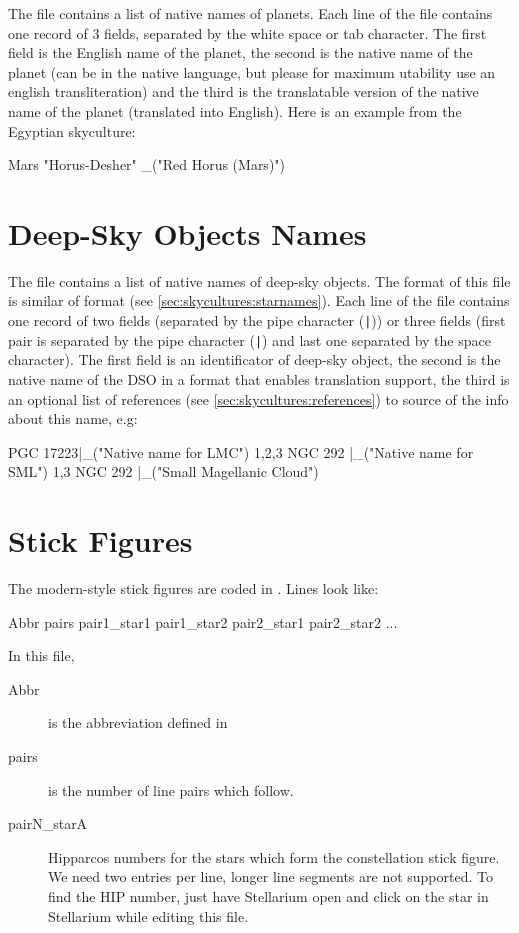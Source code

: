 The file  contains a list of native names of
planets. Each line of the file contains one record of 3 fields,
separated by the white space or tab character. The first field is the
English name of the planet, the second is the native name of the
planet (can be in the native language, but please for maximum
utability use an english transliteration) and the third is the
translatable version of the native name of the planet (translated into
English). Here is an example from the Egyptian skyculture:

\begin{configfile}
Mars	"Horus-Desher"	_("Red Horus (Mars)")
\end{configfile}

\section{Deep-Sky Objects Names}
\label{sec:skycultures:dsonames}

 The file  contains a list of native names of
deep-sky objects. The format of this file is similar of 
 format (see \ref{sec:skycultures:starnames}).
Each line of the file contains one record of two fields (separated 
by the pipe character (\texttt{|})) or three fields (first pair is 
separated by the pipe character (\texttt{|}) and last one separated 
by the space character). The first field is an identificator of 
deep-sky object, the second is the native name of the DSO in a 
format that enables translation support, the third is an optional 
list of references (see \ref{sec:skycultures:references}) to source 
of the info about this name, e.g:
\begin{configfile}
PGC 17223|_("Native name for LMC") 1,2,3
NGC 292  |_("Native name for SML") 1,3
NGC 292  |_("Small Magellanic Cloud")
\end{configfile}

\section{Stick Figures}
\label{sec:skycultures:stickfigures}



The modern-style stick figures are coded in . Lines
look like:

\begin{configfile}
Abbr pairs pair1_star1 pair1_star2 pair2_star1 pair2_star2 ...
\end{configfile}
In this file,
\begin{description}
\item[Abbr] is the abbreviation defined in 
\item[pairs] is the number of line pairs which follow.
\item[pairN\_starA] Hipparcos numbers for the stars which form the
  constellation stick figure. We need two entries per line, longer
  line segments are not supported. To find the HIP number, just have
  Stellarium open and click on the star in Stellarium while editing
  this file.
\end{description}


